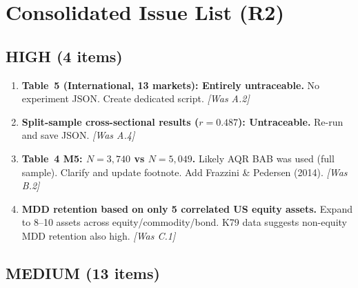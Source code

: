 \documentclass[12pt,a4paper]{article}
\begin{document}
\section{Consolidated Issue List (R2)}
\label{sec:consolidated}

\subsection*{\textcolor{highsev}{HIGH (4 items)}}

\begin{enumerate}[label=\textcolor{highsev}{\textbf{H\arabic*}}]

\item \textbf{Table~5 (International, 13 markets): Entirely untraceable.} No experiment JSON. Create dedicated script. \textit{[Was A.2]}

\item \textbf{Split-sample cross-sectional results ($r = 0.487$): Untraceable.} Re-run and save JSON. \textit{[Was A.4]}

\item \textbf{Table~4 M5: $N = 3{,}740$ vs $N = 5{,}049$.} Likely AQR BAB was used (full sample). Clarify and update footnote. Add Frazzini \& Pedersen (2014). \textit{[Was B.2]}

\item \textbf{MDD retention based on only 5 correlated US equity assets.} Expand to 8--10 assets across equity/commodity/bond. K79 data suggests non-equity MDD retention also high. \textit{[Was C.1]}

\end{enumerate}

\subsection*{\textcolor{medsev}{MEDIUM (13 items)}}
\end{document}
